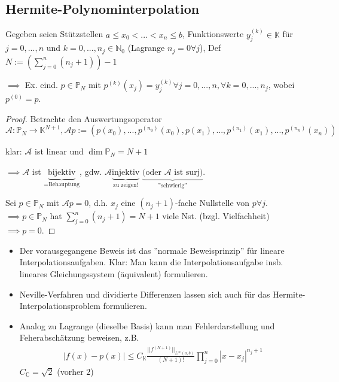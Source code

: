 \subsection{Hermite-Polynominterpolation}

\begin{theorem}[Wohlgestelltheit]
	Gegeben seien Stützstellen $a \leq x_0 < ... < x_n \leq b$, Funktionswerte $y_j^{(k)} \in \mathbb{K}$ für $j=0, ..., n$ und $k=0, ..., n_j \in \mathbb{N}_0$ (Lagrange $n_j = 0 \forall j$), Def $N := \left(\sum_{j=0}^{n}(n_j + 1)\right)-1$
	
	$\implies$ Ex. eind. $p \in \mathbb{P}_N$ mit $p^{(k)}(x_j) = y_j^{(k)} \forall j=0, ..., n, \forall k=0, ..., n_j$, wobei $p^{(0)} = p$.
\end{theorem}

\begin{proof}
	Betrachte den Auswertungsoperator $\mathcal{A}: \mathbb{P}_N \rightarrow \mathbb{K}^{N+1}, \mathcal{A}p := (p(x_0), ..., p^{(n_0)}(x_0), p(x_1), ..., p^{(n_1)}(x_1), ..., p^{(n_n)}(x_n))$
	
	klar: $\mathcal{A}$ ist linear und $\dim \mathbb{P}_N = N+1$
	
	$\implies \mathcal{A}$ ist $\underbrace{\text{bijektiv}}_{\text{=Behauptung}}$, gdw. $\mathcal{A} \underbrace{\text{injektiv}}_{\text{zu zeigen!}}$ $\underbrace{\text{(oder $\mathcal{A}$ ist surj)}}_{\text{''schwierig''}}$.
	
	Sei $p \in \mathbb{P}_N$ mit $\mathcal{A}p = 0$, d.h. $x_j$ eine $(n_j+1)$-fache Nullstelle von $p \forall j$. $\implies p \in \mathbb{P}_N$ hat $\sum_{j=0}^{n}(n_j+1) = N+1$ viele Nst. (bzgl. Vielfachheit) $\implies p = 0$. 
\end{proof}

\begin{remark}
	\begin{itemize}
		\item Der vorausgegangene Beweis ist das ''normale Beweisprinzip'' für lineare Interpolationsaufgaben. Klar: Man kann die Interpolationsaufgabe insb. lineares Gleichungssystem (äquivalent) formulieren.
		\item Neville-Verfahren und dividierte Differenzen lassen sich auch für das Hermite-Interpolationsproblem formulieren.
		\item Analog zu Lagrange (dieselbe Basis) kann man Fehlerdarstellung und Feherabschätzung beweisen, z.B.
		\begin{align*}
			|f(x)-p(x)| \leq C_{\mathbb{K}} \frac{||f^{(N+1)}||_{L^\infty(a,b)}}{(N+1)!} \prod_{j=0}^{n} |x-x_j|^{n_j+1}
		\end{align*}
		$C_{\mathbb{C}} = \sqrt{2}$ (vorher $2$)
	\end{itemize}
\end{remark}

